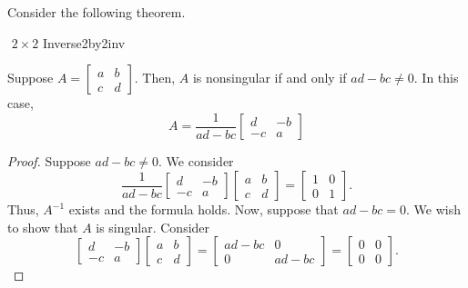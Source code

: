         \pagebreak
        \vphantom
        \\
        \\
        Consider the following theorem.
        \begin{theorem}{\Stop\,\,\(2\times 2\) Inverse}{2by2inv}

            Suppose \(A=\begin{bmatrix} a & b \\ c & d \end{bmatrix}\). Then, \(A\) is nonsingular if and only if \(ad-bc\neq0\). In this case,
            \begin{equation*}
                A=\frac{1}{ad-bc}\begin{bmatrix} d & -b \\ -c & a \end{bmatrix}
            \end{equation*}
            \begin{proof}
                Suppose \(ad-bc\neq0\). We consider
                \begin{equation*}
                    \frac{1}{ad-bc}\begin{bmatrix} d & -b \\ -c & a \end{bmatrix}\begin{bmatrix} a & b \\ c & d \end{bmatrix}=\begin{bmatrix}
                        1 & 0 \\ 
                        0 & 1
                    \end{bmatrix}.
                \end{equation*}
                Thus, \(A^{-1}\) exists and the formula holds. Now, suppose that \(ad-bc=0\). We wish to show that \(A\) is singular. Consider
                \begin{equation*}
                    \begin{bmatrix} d & -b \\ -c & a \end{bmatrix}\begin{bmatrix} a & b \\ c & d \end{bmatrix}=\begin{bmatrix} ad-bc & 0 \\ 0 & ad-bc \end{bmatrix}=\begin{bmatrix} 0 & 0 \\ 0 & 0 \end{bmatrix}.

\end{equation*}
\end{proof}
\end{theorem}
